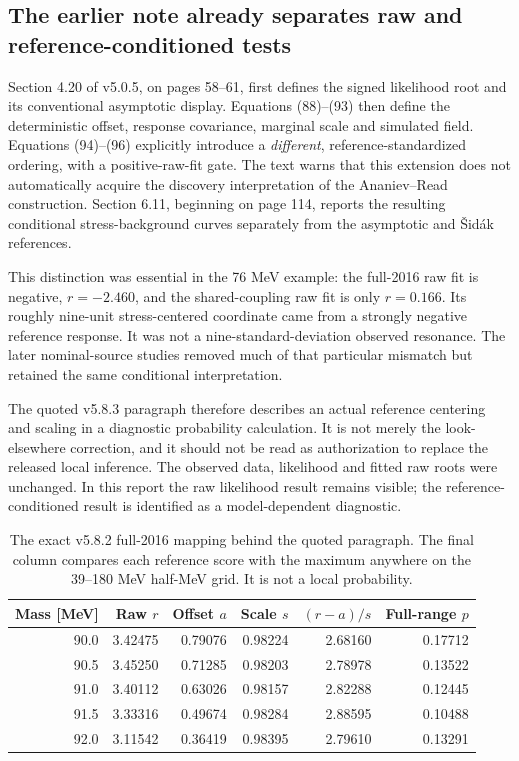 \subsection{The earlier note already separates raw and reference-conditioned tests}
Section 4.20 of v5.0.5, on pages 58--61, first defines the signed likelihood root and its conventional asymptotic display. Equations (88)--(93) then define the deterministic offset, response covariance, marginal scale and simulated field. Equations (94)--(96) explicitly introduce a \emph{different}, reference-standardized ordering, with a positive-raw-fit gate. The text warns that this extension does not automatically acquire the discovery interpretation of the Ananiev--Read construction. Section 6.11, beginning on page 114, reports the resulting conditional stress-background curves separately from the asymptotic and \v{S}id\'ak references.

This distinction was essential in the 76 MeV example: the full-2016 raw fit is negative, $r=-2.460$, and the shared-coupling raw fit is only $r=0.166$. Its roughly nine-unit stress-centered coordinate came from a strongly negative reference response. It was not a nine-standard-deviation observed resonance. The later nominal-source studies removed much of that particular mismatch but retained the same conditional interpretation.

The quoted v5.8.3 paragraph therefore describes an actual reference centering and scaling in a diagnostic probability calculation. It is not merely the look-elsewhere correction, and it should not be read as authorization to replace the released local inference. The observed data, likelihood and fitted raw roots were unchanged. In this report the raw likelihood result remains visible; the reference-conditioned result is identified as a model-dependent diagnostic.

\begin{table}[htbp]\centering\small
\begin{tabular}{rrrrrr}\toprule
Mass [MeV] & Raw $r$ & Offset $a$ & Scale $s$ & $(r-a)/s$ & Full-range $p$\\\midrule
90.0 & 3.42475 & 0.79076 & 0.98224 & 2.68160 & 0.17712\\
90.5 & 3.45250 & 0.71285 & 0.98203 & 2.78978 & 0.13522\\
91.0 & 3.40112 & 0.63026 & 0.98157 & 2.82288 & 0.12445\\
91.5 & 3.33316 & 0.49674 & 0.98284 & 2.88595 & 0.10488\\
92.0 & 3.11542 & 0.36419 & 0.98395 & 2.79610 & 0.13291\\\bottomrule
\end{tabular}
\caption{The exact v5.8.2 full-2016 mapping behind the quoted paragraph. The final column compares each reference score with the maximum anywhere on the 39--180 MeV half-MeV grid. It is not a local probability.}
\label{tab:history_mapping}
\end{table}

